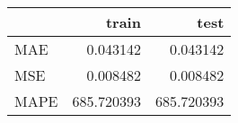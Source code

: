 \begin{tabular}{lrr}
\toprule
{} &       train &        test \\
\midrule
MAE  &    0.043142 &    0.043142 \\
MSE  &    0.008482 &    0.008482 \\
MAPE &  685.720393 &  685.720393 \\
\bottomrule
\end{tabular}
